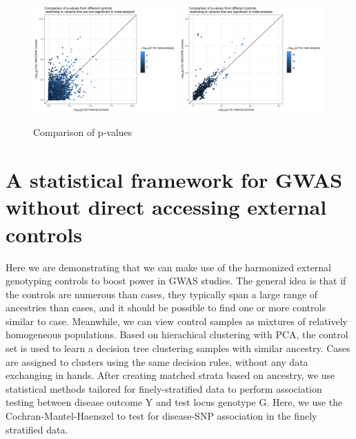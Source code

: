 \documentclass[12pt]{amsart}
\begin{document}
\begin{figure}[H]
    \includegraphics[width=0.49\textwidth]{qc/pvalues_non-significant.png}
    \includegraphics[width=0.49\textwidth]{qc/pvalues_significant.png}
    \caption{Comparison of p-values}
    \label{fig:pvalues}
\end{figure}


\section{A statistical framework for GWAS without direct accessing external controls}

Here we are demonstrating that we can make use of the harmonized external genotyping controls to boost power in GWAS studies. The general idea is that if the controls are numerous than cases, they typically span a large range of ancestries than cases, and it should be possible to find one or more controls similar to case.  Meanwhile, we can view control samples as mixtures of relatively homogeneous populations. Based on hierachical clustering with PCA, the control set is used to learn a decision tree clustering samples with similar ancestry. Cases are assigned to clusters using the same decision rules, without any data exchanging in hands. After creating matched strata based on ancestry, we use statistical methods tailored for finely-stratified data to perform association testing between disease outcome Y and test locus genotype G. Here, we use the Cochran-Mantel-Haenszel to test for disease-SNP association in the finely stratified data.  
\end{document}
